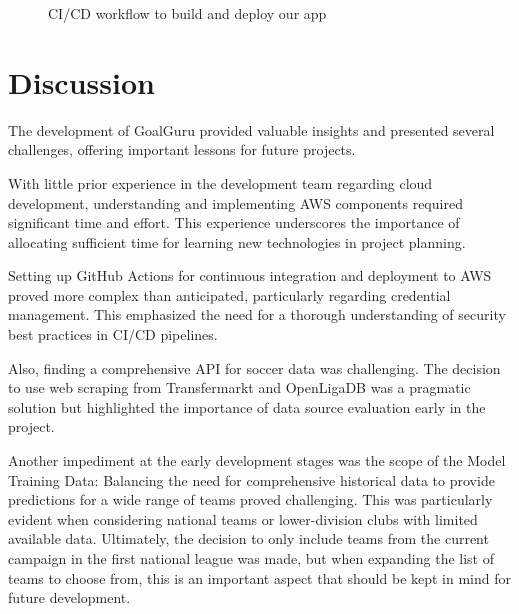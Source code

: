 \documentclass[conference,a4paper,flushend]{cs-techrep}
\begin{document}
\begin{figure}[ht]
    \centering

    \caption{CI/CD workflow to build and deploy our app}
    \label{fig:cicd_workflow}
\end{figure}



\section{Discussion} \label{discussion}

The development of GoalGuru provided valuable insights and presented several challenges, offering important lessons for future projects. 

With little prior experience in the development team regarding cloud development, understanding and implementing AWS components required significant time and effort. This experience underscores the importance of allocating sufficient time for learning new technologies in project planning.

Setting up GitHub Actions for continuous integration and deployment to AWS proved more complex than anticipated, particularly regarding credential management. This emphasized the need for a thorough understanding of security best practices in CI/CD pipelines.

Also, finding a comprehensive API for soccer data was challenging. The decision to use web scraping from Transfermarkt and OpenLigaDB was a pragmatic solution but highlighted the importance of data source evaluation early in the project.

Another impediment at the early development stages was the scope of the Model Training Data: Balancing the need for comprehensive historical data to provide predictions for a wide range of teams proved challenging. This was particularly evident when considering national teams or lower-division clubs with limited available data. Ultimately, the decision to only include teams from the current campaign in the first national league was made, but when expanding the list of teams to choose from, this is an important aspect that should be kept in mind for future development.
\end{document}
